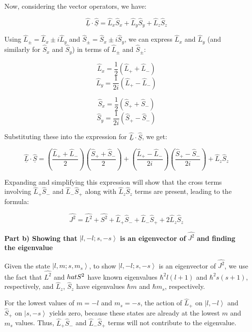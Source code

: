 Now, considering the vector operators, we have:

\[ \hat{\underline{L}} \cdot \hat{\underline{S}} = \hat{L}_{x}\hat{S}_{x} + \hat{L}_{y}\hat{S}_{y} + \hat{L}_{z}\hat{S}_{z} \]

Using \( \hat{L}_{\pm} = \hat{L}_{x} \pm i\hat{L}_{y} \) and \( \hat{S}_{\pm} = \hat{S}_{x} \pm i\hat{S}_{y} \), we can express \( \hat{L}_{x} \) and \( \hat{L}_{y} \) (and similarly for \( \hat{S}_{x} \) and \( \hat{S}_{y} \)) in terms of \( \hat{L}_{\pm} \) and \( \hat{S}_{\pm} \):

\[ \hat{L}_{x} = \frac{1}{2}(\hat{L}_{+} + \hat{L}_{-}) \]
\[ \hat{L}_{y} = \frac{1}{2i}(\hat{L}_{+} - \hat{L}_{-}) \]

\[ \hat{S}_{x} = \frac{1}{2}(\hat{S}_{+} + \hat{S}_{-}) \]
\[ \hat{S}_{y} = \frac{1}{2i}(\hat{S}_{+} - \hat{S}_{-}) \]

Substituting these into the expression for \( \hat{\underline{L}} \cdot \hat{\underline{S}} \), we get:

\[ \hat{\underline{L}} \cdot \hat{\underline{S}} = \left( \frac{\hat{L}_{+} + \hat{L}_{-}}{2} \right) \left( \frac{\hat{S}_{+} + \hat{S}_{-}}{2} \right) + \left( \frac{\hat{L}_{+} - \hat{L}_{-}}{2i} \right) \left( \frac{\hat{S}_{+} - \hat{S}_{-}}{2i} \right) + \hat{L}_{z}\hat{S}_{z} \]

Expanding and simplifying this expression will show that the cross terms involving \( \hat{L}_{+}\hat{S}_{-} \) and \( \hat{L}_{-}\hat{S}_{+} \) along with \( \hat{L}_{z}\hat{S}_{z} \) terms are present, leading to the formula:

\[ \hat{J^{2}} = \hat{L^{2}} + \hat{S^{2}} + \hat{L}_{+}\hat{S}_{-} + \hat{L}_{-}\hat{S}_{+} + 2\hat{L}_{z}\hat{S}_{z} \]

\textbf{Part b) Showing that} \( \left|l, -l; s, -s \right> \) \textbf{is an eigenvector of} \( \hat{J^{2}} \) \textbf{and finding the eigenvalue}

Given the state \( \left|l, m; s, m_{s} \right> \), to show \( \left|l, -l; s, -s \right> \) is an eigenvector of \( \hat{J^{2}} \), we use the fact that \( \hat{L^{2}} \) and \( \\hat{S^{2}} \) have known eigenvalues \( \hbar^2 l(l+1) \) and \( \hbar^2 s(s+1) \), respectively, and \( \hat{L}_{z} \), \( \hat{S}_{z} \) have eigenvalues \( \hbar m \) and \( \hbar m_{s} \), respectively.

For the lowest values of \( m = -l \) and \( m_{s} = -s \), the action of \( \hat{L}_{+} \) on \( \left|l, -l \right> \) and \( \hat{S}_{+} \) on \( \left|s, -s \right> \) yields zero, because these states are already at the lowest \( m \) and \( m_{s} \) values. Thus, \( \hat{L}_{+}\hat{S}_{-} \) and \( \hat{L}_{-}\hat{S}_{+} \) terms will not contribute to the eigenvalue.

